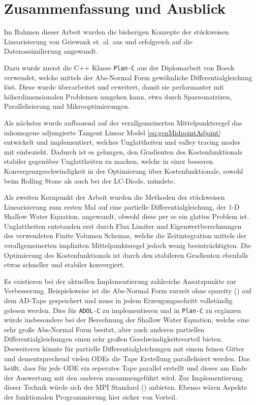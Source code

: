 \chapter{Zusammenfassung und Ausblick}

Im Rahmen dieser Arbeit wurden die bisherigen Konzepte der stückweisen Linearisierung von Griewank et. al. aus \cite{monster} und \cite{plan} erfolgreich auf die Datenassimilierung angewandt.

Dazu wurde zuerst die C++ Klasse \texttt{Plan-C} aus der Diplomarbeit von Boeck \cite{boeck14} verwendet, welche mittels der Abs-Normal Form gewöhnliche Differentialgleichung löst. Diese wurde überarbeitet und erweitert, damit sie performanter mit höherdimensionalen Problemen umgehen kann, etwa durch Sparsematrizen, Parallelisierung und Mikrooptimierungen. 

Als nächstes wurde aufbauend auf der verallgemeinerten Mittelpunktsregel das inhomogene adjungierte Tangent Linear Model \eqref{eq:genMidpointAdjoint} entwickelt und implementiert, welches Unglattheiten und valley tracing modes mit einbezieht. Dadurch ist es gelungen, den Gradienten des Kostenfunktionals stabiler gegenüber Unglattheiten zu machen, welche in einer besseren Konvergenzgeschwindigkeit in der Optimierung über Kostenfunktionale, sowohl beim Rolling Stone als auch bei der LC-Diode, mündete.

Als zweiten Kernpunkt der Arbeit wurden die Methoden der stückweisen Linearisierung zum ersten Mal auf eine partielle Differentialgleichung, der 1-D Shallow Water Equation, angewandt, obwohl diese per se ein glattes Problem ist. Unglattheiten entstanden erst durch Flux Limiter und Eigenwertberechnungen des verwendeten Finite Volumen Schemas, welche die Zeitintegration mittels der verallgemeinerten impliziten Mittelpunktsregel jedoch wenig beeinträchtigten.
Die Optimierung des Kostenfunktionals ist durch den stabileren Gradienten ebenfalls etwas schneller und stabiler konvergiert.

Es existieren bei der aktuellen Implementierung zahlreiche Ansatzpunkte zur Verbesserung. Beispielsweise ist die Abs-Normal Form zurzeit ohne sparsity (\cite[S.137 ff.]{griewank2008evaluating}) auf dem AD-Tape gespeichert und muss in jedem Erzeugungsschritt vollständig gelesen werden. Dies für \texttt{ADOL-C} zu implementieren und in \texttt{Plan-C} zu ergänzen  würde insbesondere bei der Berechnung der Shallow Water Equation, welche eine sehr große Abs-Normal Form besitzt, aber auch anderen partiellen Differentialgleichungen einen sehr großen Geschwindigkeitsvorteil bieten. 
Desweiteren könnte für partielle Differentialgleichungen mit einem feinen Gitter und dementsprechend vielen ODEs die Tape Erstellung parallelisiert werden. Das heißt, dass für jede ODE ein seperates Tape parallel erstellt und dieses am Ende der Auswertung mit den anderen zusammengeführt wird. Zur Implementierung dieser Technik würde sich der MPI Standard (\cite{mpi}) anbieten. Ebenso wären Aspekte der funktionalen Programmierung hier sicher von Vorteil.

